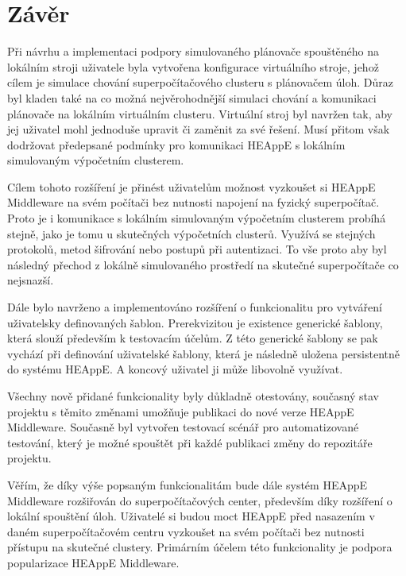 \chapter{Závěr}
Při návrhu a implementaci podpory simulovaného plánovače spouštěného na lokálním stroji uživatele byla vytvořena konfigurace virtuálního stroje, jehož cílem je simulace chování superpočítačového clusteru s plánovačem úloh. Důraz byl kladen také na co možná nejvěrohodnější simulaci chování a komunikaci plánovače na lokálním virtuálním clusteru. Virtuální stroj byl navržen tak, aby jej uživatel mohl jednoduše upravit či zaměnit za své řešení. Musí přitom však dodržovat předepsané podmínky pro komunikaci HEAppE s lokálním simulovaným výpočetním clusterem.

Cílem tohoto rozšíření je přinést uživatelům možnost vyzkoušet si HEAppE Middleware na svém počítači bez nutnosti napojení na fyzický superpočítač. Proto je i komunikace s lokálním simulovaným výpočetním clusterem probíhá stejně, jako je tomu u skutečných výpočetních clusterů. Využívá se stejných protokolů, metod šifrování nebo postupů při autentizaci. To vše proto aby byl následný přechod z lokálně simulovaného prostředí na skutečné superpočítače co nejsnazší.

Dále bylo navrženo a implementováno rozšíření o funkcionalitu pro vytváření uživatelsky definovaných šablon. Prerekvizitou je existence generické šablony, která slouží především k testovacím účelům. Z této generické šablony se pak vychází při definování uživatelské šablony, která je následně uložena persistentně do systému HEAppE. A koncový uživatel ji může libovolně využívat.

Všechny nově přidané funkcionality byly důkladně otestovány, současný stav projektu s těmito změnami umožňuje publikaci do nové verze HEAppE Middleware. Současně byl vytvořen testovací scénář pro automatizované testování, který je možné spouštět při každé publikaci změny do repozitáře projektu.

Věřím, že díky výše popsaným funkcionalitám bude dále systém HEAppE Middleware rozšiřován do superpočítačových center, především díky rozšíření o lokální spouštění úloh. Uživatelé si budou moct HEAppE před nasazením v daném superpočítačovém centru vyzkoušet na svém počítači bez nutnosti přístupu na skutečné clustery. Primárním účelem této funkcionality je podpora popularizace HEAppE Middleware.
\endinput